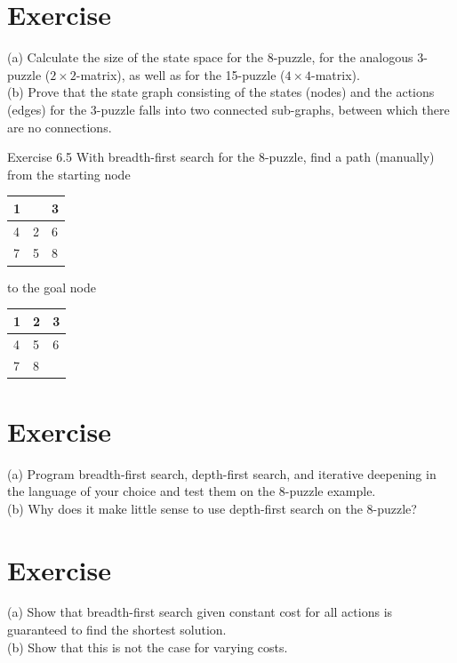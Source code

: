 \documentclass[10pt]{book}
\begin{document}
\section{Exercise}
(a) Calculate the size of the state space for the 8-puzzle, for the analogous 3-puzzle ($2 \times 2$-matrix), as well as for the 15-puzzle ($4 \times 4$-matrix).\\
(b) Prove that the state graph consisting of the states (nodes) and the actions (edges) for the 3-puzzle falls into two connected sub-graphs, between which there are no connections.

Exercise 6.5 With breadth-first search for the 8-puzzle, find a path (manually) from the starting node

\begin{center}
\begin{tabular}{|l|l|l|}
\hline
1 &  & 3 \\
\hline
4 & 2 & 6 \\
\hline
7 & 5 & 8 \\
\hline
\end{tabular}
\end{center}

to the goal node

\begin{center}
\begin{tabular}{|l|l|l|}
\hline
1 & 2 & 3 \\
\hline
4 & 5 & 6 \\
\hline
7 & 8 &  \\
\hline
\end{tabular}
\end{center}

\section{Exercise}
(a) Program breadth-first search, depth-first search, and iterative deepening in the language of your choice and test them on the 8-puzzle example.\\
(b) Why does it make little sense to use depth-first search on the 8-puzzle?

\section{Exercise}
(a) Show that breadth-first search given constant cost for all actions is guaranteed to find the shortest solution.\\
(b) Show that this is not the case for varying costs.
\end{document}
